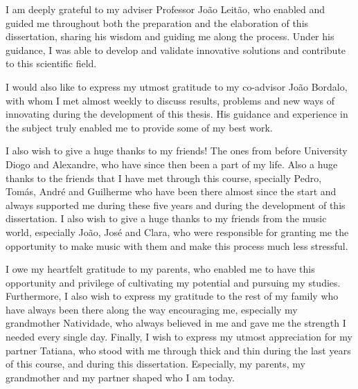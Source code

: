 
%

\begin{ntacknowledgements}

I am deeply grateful to my adviser Professor João Leitão, who enabled and guided me throughout both the preparation and the elaboration of this dissertation, sharing his wisdom and guiding me along the process. Under his guidance, I was able to develop and validate innovative solutions and contribute to this scientific field.

I would also like to express my utmost gratitude to my co-advisor João Bordalo, with whom I met almost weekly to discuss results, problems and new ways of innovating during the development of this thesis. His guidance and experience in the subject truly enabled me to provide some of my best work.

I also wish to give a huge thanks to my friends! The ones from before University Diogo and Alexandre, who have since then been a part of my life. Also a huge thanks to the friends that I have met through this course, specially Pedro, Tomás, André and Guilherme who have been there almost since the start and always supported me during these five years and during the development of this dissertation. I also wish to give a huge thanks to my friends from the music world, especially João, José and Clara, who were responsible for granting me the opportunity to make music with them and make this process much less stressful.

I owe my heartfelt gratitude to my parents, who enabled me to have this opportunity and privilege of cultivating my potential and pursuing my studies. Furthermore, I also wish to express my gratitude to the rest of my family who have always been there along the way encouraging me, especially my grandmother Natividade, who always believed in me and gave me the strength I needed every single day. Finally, I wish to express my utmost appreciation for my partner Tatiana, who stood with me through thick and thin during the last years of this course, and during this dissertation. Especially, my parents, my grandmother and my partner shaped who I am today.

\end{ntacknowledgements}